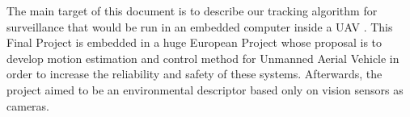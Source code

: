 

The main target of this document is to describe our tracking algorithm for surveillance that would be run in an embedded computer inside a UAV \cite{Image_processing_UAV}.  This Final Project is embedded in a huge European Project whose proposal is to develop motion estimation and control method for Unmanned Aerial Vehicle in order to increase the reliability and safety of these systems. Afterwards, the project aimed to be an environmental descriptor based only on vision sensors as cameras. \\


 
